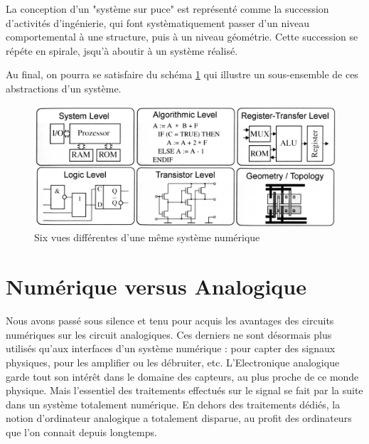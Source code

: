 La conception d'un "système sur puce" est représenté comme la
succession d'activités d'ingénierie, qui font systèmatiquement passer d'un niveau comportemental à une structure, puis à un niveau géométrie.
Cette succession se répéte en spirale, jsqu'à aboutir à un système réalisé.

Au final, on pourra se satisfaire du schéma \ref{abstractions} qui illustre un sous-ensemble de ces abstractions d'un système.

\begin{figure}[htb]
\begin{center}
\includegraphics[scale=0.4]{figures/abstractions.png}
\caption{Six vues différentes d'une même système numérique}
\label{abstractions}
\end{center}
\end{figure}


\section{Numérique versus Analogique}

Nous avons passé sous silence et tenu pour acquis les avantages des circuits numériques sur les circuit analogiques. Ces derniers
ne sont désormais plus utilisés qu'aux interfaces d'un système numérique : pour capter des signaux physiques, pour les amplifier ou les débruiter, etc.
L'Electronique analogique garde tout son intérêt dans le domaine des capteurs, au plus proche de ce monde physique. Mais l'essentiel des traitements effectués
sur le signal se fait par la suite dans un système totalement numérique. En dehors des traitements dédiés, la notion d'ordinateur analogique a totalement disparue, au profit
des ordinateurs que l'on connait depuis longtemps.

